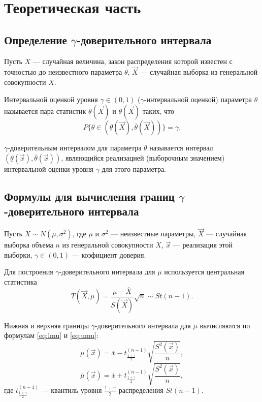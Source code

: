 \chapter{Теоретическая часть}
\section{Определение $\gamma$-доверительного интервала}

Пусть $X$ --- случайная величина, закон распределения которой известен с точностью до неизвестного параметра $\theta$, $\vec{X}$ --- случайная выборка из генеральной совокупности $X$.

Интервальной оценкой уровня $\gamma \in (0, 1)$ ($\gamma$-интервальной оценкой) параметра $\theta$ называется пара статистик $\underline{\theta}(\vec{X})$ и $\overline{\theta}(\vec{X})$ таких, что
\begin{equation*}
	P\{\theta \in (\underline{\theta}(\vec{X}), \overline{\theta}(\vec{X}))\} = \gamma.
\end{equation*}

$\gamma$-доверительным интервалом для параметра $\theta$ называется интервал $(\underline{\theta}(\vec{x}), \overline{\theta}(\vec{x}))$, являющийся реализацией (выборочным значением) интервальной оценки уровня $\gamma$ для этого параметра.

\section{Формулы для вычисления границ $\gamma$-доверительного интервала}

Пусть $X \sim N(\mu, \sigma^2)$, где $\mu$ и $\sigma^2$ --- неизвестные параметры, $\vec{X}$ --- случайная выборка объема $n$ из генеральной совокупности $X$, $\vec{x}$ --- реализация этой выборки, $\gamma \in (0, 1)$ --- коэфициент доверия.

Для построения $\gamma$-доверительного интервала для $\mu$ используется центральная статистика
\begin{equation*}
	T(\vec{X}, \mu) = \frac{\mu - \overline{X}}{S(\vec{X})}\sqrt{n} \sim St(n - 1).
\end{equation*}

Нижняя и верхняя границы $\gamma$-доверительного интервала для $\mu$ вычисляются по формулам \eqref{eq:lmu} и \eqref{eq:umu}:
\begin{equation}
	\label{eq:lmu}
	\underline{\mu}(\vec{x}) = \overline{x} - t_{\frac{1+\gamma}{2}}^{(n-1)}\sqrt{\frac{S^2(\vec{x})}{n}},
\end{equation}
\begin{equation}
	\label{eq:umu}
	\overline{\mu}(\vec{x}) = \overline{x} + t_{\frac{1+\gamma}{2}}^{(n-1)}\sqrt{\frac{S^2(\vec{x})}{n}},
\end{equation}
\noindent
где $t_{\frac{1+\gamma}{2}}^{(n-1)}$ --- квантиль уровня $\frac{1+\gamma}{2}$ распределения $St(n - 1)$.

